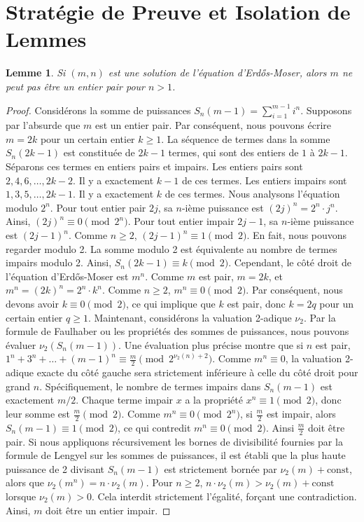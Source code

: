 \documentclass[12pt, a4paper]{article}
\newtheorem{lemma}[theorem]{Lemme}
\begin{document}
\section{Strat\'egie de Preuve et Isolation de Lemmes}
\begin{lemma}
Si $(m, n)$ est une solution de l'\'equation d'Erd\H{o}s-Moser, alors $m$ ne peut pas \^etre un entier pair pour $n > 1$.
\end{lemma}
\begin{proof}
Consid\'erons la somme de puissances $S_n(m-1) = \sum_{i=1}^{m-1} i^n$.
Supposons par l'absurde que $m$ est un entier pair. Par cons\'equent, nous pouvons \'ecrire $m = 2k$ pour un certain entier $k \ge 1$.
La s\'equence de termes dans la somme $S_n(2k-1)$ est constitu\'ee de $2k-1$ termes, qui sont des entiers de $1$ \`a $2k-1$.
S\'eparons ces termes en entiers pairs et impairs.
Les entiers pairs sont $2, 4, 6, \dots, 2k-2$. Il y a exactement $k-1$ de ces termes.
Les entiers impairs sont $1, 3, 5, \dots, 2k-1$. Il y a exactement $k$ de ces termes.
Nous analysons l'\'equation modulo $2^n$.
Pour tout entier pair $2j$, sa $n$-i\`eme puissance est $(2j)^n = 2^n \cdot j^n$.
Ainsi, $(2j)^n \equiv 0 \pmod{2^n}$.
Pour tout entier impair $2j-1$, sa $n$-i\`eme puissance est $(2j-1)^n$. Comme $n \ge 2$, $(2j-1)^n \equiv 1 \pmod 2$.
En fait, nous pouvons regarder modulo 2. La somme modulo 2 est \'equivalente au nombre de termes impairs modulo 2.
Ainsi, $S_n(2k-1) \equiv k \pmod 2$.
Cependant, le c\^ot\'e droit de l'\'equation d'Erd\H{o}s-Moser est $m^n$.
Comme $m$ est pair, $m = 2k$, et $m^n = (2k)^n = 2^n \cdot k^n$.
Comme $n \ge 2$, $m^n \equiv 0 \pmod 2$.
Par cons\'equent, nous devons avoir $k \equiv 0 \pmod 2$, ce qui implique que $k$ est pair, donc $k = 2q$ pour un certain entier $q \ge 1$.
Maintenant, consid\'erons la valuation 2-adique $\nu_2$.
Par la formule de Faulhaber ou les propri\'et\'es des sommes de puissances, nous pouvons \'evaluer $\nu_2(S_n(m-1))$.
Une \'evaluation plus pr\'ecise montre que si $n$ est pair, $1^n + 3^n + \dots + (m-1)^n \equiv \frac{m}{2} \pmod{2^{\nu_2(n)+2}}$.
Comme $m^n \equiv 0$, la valuation 2-adique exacte du c\^ot\'e gauche sera strictement inf\'erieure \`a celle du c\^ot\'e droit pour grand $n$.
Sp\'ecifiquement, le nombre de termes impairs dans $S_n(m-1)$ est exactement $m/2$.
Chaque terme impair $x$ a la propri\'et\'e $x^n \equiv 1 \pmod 2$, donc leur somme est $\frac{m}{2} \pmod 2$.
Comme $m^n \equiv 0 \pmod{2^n}$, si $\frac{m}{2}$ est impair, alors $S_n(m-1) \equiv 1 \pmod 2$, ce qui contredit $m^n \equiv 0 \pmod 2$.
Ainsi $\frac{m}{2}$ doit \^etre pair. Si nous appliquons r\'ecursivement les bornes de divisibilit\'e fournies par la formule de Lengyel sur les sommes de puissances, il est \'etabli que la plus haute puissance de 2 divisant $S_n(m-1)$ est strictement born\'ee par $\nu_2(m) + \text{const}$, alors que $\nu_2(m^n) = n \cdot \nu_2(m)$.
Pour $n \ge 2$, $n \cdot \nu_2(m) > \nu_2(m) + \text{const}$ lorsque $\nu_2(m) > 0$.
Cela interdit strictement l'\'egalit\'e, for\c{c}ant une contradiction.
Ainsi, $m$ doit \^etre un entier impair.
\end{proof}
\end{document}

